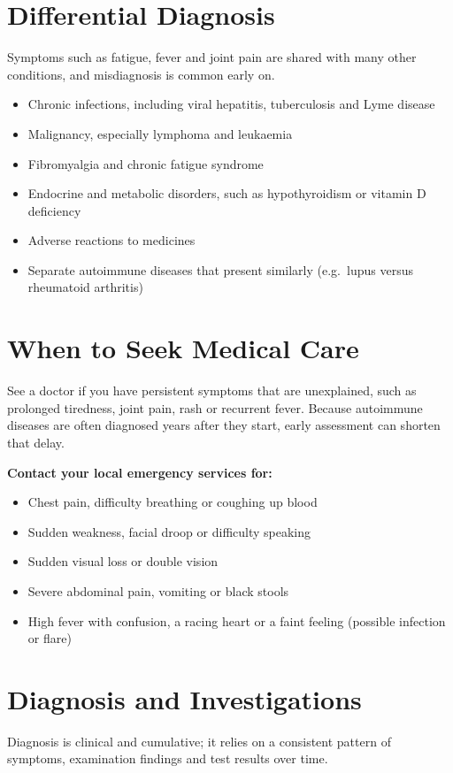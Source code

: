 \section*{Differential Diagnosis}
Symptoms such as fatigue, fever and joint pain are shared with many other conditions, and misdiagnosis is common early on.

\begin{itemize}
    \item Chronic infections, including viral hepatitis, tuberculosis and Lyme disease
    \item Malignancy, especially lymphoma and leukaemia
    \item Fibromyalgia and chronic fatigue syndrome
    \item Endocrine and metabolic disorders, such as hypothyroidism or vitamin D deficiency
    \item Adverse reactions to medicines
    \item Separate autoimmune diseases that present similarly (e.g.\ lupus versus rheumatoid arthritis)
\end{itemize}

\section*{When to Seek Medical Care}
See a doctor if you have persistent symptoms that are unexplained, such as prolonged tiredness, joint pain, rash or recurrent fever. Because autoimmune diseases are often diagnosed years after they start, early assessment can shorten that delay.

\textbf{Contact your local emergency services for:}
\begin{itemize}
    \item Chest pain, difficulty breathing or coughing up blood
    \item Sudden weakness, facial droop or difficulty speaking
    \item Sudden visual loss or double vision
    \item Severe abdominal pain, vomiting or black stools
    \item High fever with confusion, a racing heart or a faint feeling (possible infection or flare)
\end{itemize}

\section*{Diagnosis and Investigations}
Diagnosis is clinical and cumulative; it relies on a consistent pattern of symptoms, examination findings and test results over time.

